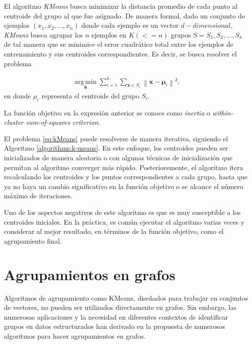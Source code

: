 El algoritmo \textit{KMeans} busca minimizar la distancia promedio de cada punto al centroide del grupo al que fue asignado. De manera formal, dado un conjunto de ejemplos $(x_1, x_2, ..., x_n)$ donde cada ejemplo es un vector $d-dimensional$, \textit{KMeans} busca agrupar los $n$ ejemplos en $K(<=n)$ grupos $S = {S_1, S_2, ..., S_k}$ de tal manera que se minimice el error cuadrático total entre los ejemplos de entrenamiento y sus centroides correspondientes. Es decir, se busca resolver el problema 

\begin{align} \label{eq:kMeans}
\displaystyle {\underset {\mathbf {S} }{\operatorname {arg\,min} }}\sum _{i=1}^{k}\sum _{\mathbf {x} \in S_{i}}\left\|\mathbf {x} -{\boldsymbol {\mu }}_{i}\right\|^{2},
\end{align}
en donde $\mu_i$ representa el centroide del grupo $S_i$. 

La función objetivo en la expresión anterior se conoce como \textit{inertia} o \textit{within-cluster sum-of-squares criterion}.

El problema \ref{eq:kMeans} puede resolverse de manera iterativa, siguiendo el Algoritmo \ref{algorithms:k-means}. En este enfoque, los centroides pueden ser inicializados de manera aleatoria o con algunas técnicas de inicialización que permitan al algoritmo converger más rápido. Posterioremente, el algoritmo itera recalculando los centroides y los puntos correspondientes a cada grupo, hasta que ya no haya un cambio significativo en la función objetivo o se alcance el número máximo de iteraciones. 

Uno de los aspectos negativos de este algoritmo es que es muy susceptible a los centroides iniciales. En la práctica, es común ejecutar el algoritmo varias veces y considerar al mejor resultado, en términos de la función objetivo, como el agrupamiento final.

\label{algorithms:k-means}

\section{Agrupamientos en grafos}
Algoritmos de agrupamiento como KMeans, diseñados para trabajar en conjuntos de vectores, no pueden ser utilizados directamente en grafos. Sin embargo, las numerosas aplicaciones y la necesidad en diferentes contextos de identificar grupos en datos estructurados han derivado en la propuesta de numerosos algoritmos para hacer agrupamientos en grafos.

